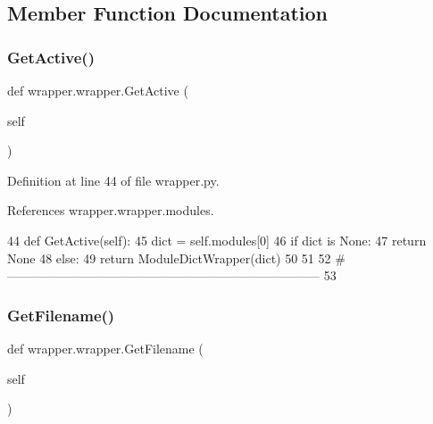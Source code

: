 \subsection{Member Function Documentation}
\mbox{\label{classwrapper_1_1wrapper_a97ff384380baa3e200f92f20bf48fffa}} 
\subsubsection{\texorpdfstring{Get\+Active()}{GetActive()}}
{\footnotesize\ttfamily def wrapper.\+wrapper.\+Get\+Active (\begin{DoxyParamCaption}\item[{}]{self }\end{DoxyParamCaption})}



Definition at line 44 of file wrapper.\+py.



References wrapper.\+wrapper.\+modules.


\begin{DoxyCode}
44     \textcolor{keyword}{def }GetActive(self):
45         dict = self.modules[0]
46         \textcolor{keywordflow}{if} dict \textcolor{keywordflow}{is} \textcolor{keywordtype}{None}:
47             \textcolor{keywordflow}{return} \textcolor{keywordtype}{None}
48         \textcolor{keywordflow}{else}:
49             \textcolor{keywordflow}{return} ModuleDictWrapper(dict)
50 
51 
52 \textcolor{comment}{#---------------------------------------------------------------------------}
53 
\end{DoxyCode}
\mbox{\label{classwrapper_1_1wrapper_a38e355694400434e5759ad0a70e4d1bc}} 
\subsubsection{\texorpdfstring{Get\+Filename()}{GetFilename()}}
{\footnotesize\ttfamily def wrapper.\+wrapper.\+Get\+Filename (\begin{DoxyParamCaption}\item[{}]{self }\end{DoxyParamCaption})}



